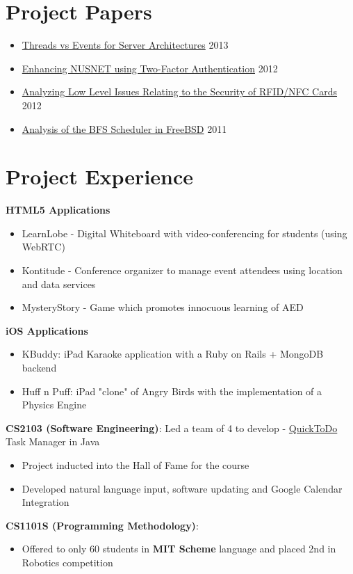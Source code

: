 \documentclass[11pt,a4paper]{moderncv}
\begin{document}
\section{Project Papers}
\begin{itemize}
\item \href{http://vellvisher.github.io/papers_reports/doc/Threads_vs_Events_Server_Architectures.pdf}{Threads vs Events for Server Architectures} \hfill 2013
\item \href{http://vellvisher.github.io/papers_reports/doc/NUS_2FA_GA.pdf}{Enhancing NUSNET using Two-Factor Authentication} \hfill 2012
\item \href{http://vellvisher.github.io/papers_reports/doc/RFID_NFC.pdf}{Analyzing Low Level Issues Relating to the Security of RFID/NFC Cards} \hfill 2012
\item \href{http://vellvisher.github.io/papers_reports/doc/BFS_FreeBSD.pdf}{Analysis of the BFS Scheduler in FreeBSD} \hfill 2011
\end{itemize}
\section{Project Experience}
\textbf{HTML5 Applications}
\begin{itemize}
    \item LearnLobe - Digital Whiteboard with video-conferencing for students (using WebRTC)
    \item Kontitude - Conference organizer to manage event attendees using location and data services
    \item MysteryStory - Game which promotes innocuous learning of AED
\end{itemize}
\textbf{iOS Applications}
\begin{itemize}
     \item KBuddy: iPad Karaoke application with a Ruby on Rails + MongoDB backend
     \item Huff n Puff: iPad "clone" of Angry Birds with the implementation of a Physics Engine
\end{itemize}
\textbf{CS2103 (Software Engineering)}: Led a team of 4 to develop - \href{http://github.com/vellvisher/quicktodo}{QuickToDo} Task Manager in Java
 \begin{itemize}
 \item Project inducted into the
   Hall of Fame for the course
     \item Developed natural language input, software updating and Google Calendar Integration
 \end{itemize}
 \textbf{CS1101S (Programming Methodology)}:
 \begin{itemize}
    \item Offered to only 60 students in \textbf{MIT Scheme} language and placed 2nd in Robotics competition
 \end{itemize}
\end{document}
